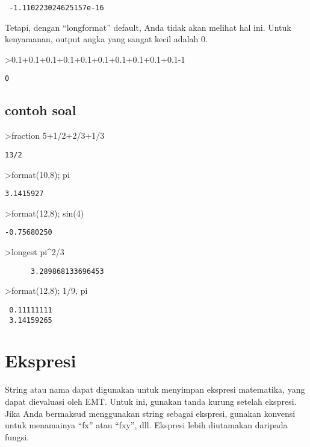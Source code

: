 \documentclass[
]{book}
\begin{document}
\begin{verbatim}
 -1.110223024625157e-16 
\end{verbatim}

Tetapi, dengan ``longformat'' default, Anda tidak akan melihat hal ini. Untuk kenyamanan, output angka yang sangat kecil adalah 0.

\textgreater0.1+0.1+0.1+0.1+0.1+0.1+0.1+0.1+0.1+0.1-1

\begin{verbatim}
0
\end{verbatim}

\section{contoh soal}\label{contoh-soal-4}

\textgreater fraction 5+1/2+2/3+1/3

\begin{verbatim}
13/2
\end{verbatim}

\textgreater format(10,8); pi

\begin{verbatim}
3.1415927 
\end{verbatim}

\textgreater format(12,8); sin(4)

\begin{verbatim}
-0.75680250 
\end{verbatim}

\textgreater longest pi\^{}2/3

\begin{verbatim}
      3.289868133696453 
\end{verbatim}

\textgreater format(12,8); 1/9, pi

\begin{verbatim}
 0.11111111 
 3.14159265 
\end{verbatim}

\chapter{Ekspresi}\label{ekspresi}

String atau nama dapat digunakan untuk menyimpan ekspresi matematika, yang dapat dievaluasi oleh EMT. Untuk ini, gunakan tanda kurung setelah ekspresi. Jika Anda bermaksud menggunakan string sebagai ekspresi, gunakan konvensi untuk menamainya ``fx'' atau ``fxy'', dll. Ekspresi lebih diutamakan daripada fungsi.
\end{document}
